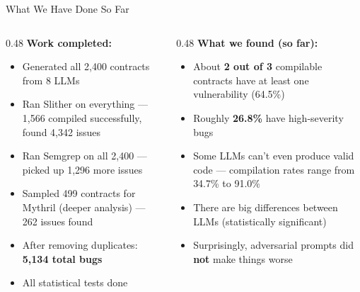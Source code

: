 \documentclass[aspectratio=169]{beamer}
\begin{document}
\begin{frame}{What We Have Done So Far}
\begin{columns}
\begin{column}{0.48\textwidth}
\textbf{Work completed:}
\begin{itemize}\small
    \item[\checkmark] Generated all 2,400 contracts from 8 LLMs
    \item[\checkmark] Ran Slither on everything --- 1,566 compiled successfully, found 4,342 issues
    \item[\checkmark] Ran Semgrep on all 2,400 --- picked up 1,296 more issues
    \item[\checkmark] Sampled 499 contracts for Mythril (deeper analysis) --- 262 issues found
    \item[\checkmark] After removing duplicates: \textbf{5,134 total bugs}
    \item[\checkmark] All statistical tests done
\end{itemize}
\end{column}
\begin{column}{0.48\textwidth}
\textbf{What we found (so far):}
\begin{itemize}\small
    \item About \textbf{2 out of 3} compilable contracts have at least one vulnerability (64.5\%)
    \item Roughly \textbf{26.8\%} have high-severity bugs
    \item Some LLMs can't even produce valid code --- compilation rates range from 34.7\% to 91.0\%
    \item There are big differences between LLMs (statistically significant)
    \item Surprisingly, adversarial prompts did \textbf{not} make things worse
\end{itemize}
\end{column}
\end{columns}
\end{frame}
\end{document}
